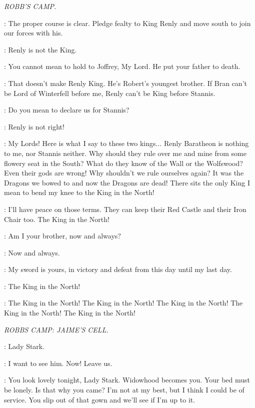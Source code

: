 \scene

\textit{ROBB'S CAMP.}


\GLOVER: The proper course is clear. Pledge fealty to King Renly and move south to join our forces with his. 

\ROBB: Renly is not the King. 

\GLOVER: You cannot mean to hold to Joffrey, My Lord. He put your father to death. 

\ROBB: That doesn't make Renly King. He's Robert's youngest brother. If Bran can't be Lord of Winterfell before me, Renly can't be King before Stannis. 

\GLOVER: Do you mean to declare us for Stannis? 

\BRACKEN: Renly is not right! 

\UMBER: My Lords! Here is what I say to these two kings$\ldots$  Renly
Baratheon is nothing to me, nor Stannis neither. Why should they rule
over me and mine from some flowery seat in the South? What do they
know of the Wall or the Wolfswood? Even their gods are wrong! Why
shouldn't we rule ourselves again? It was the Dragons we bowed to and
now the Dragons are dead! There sits the only King I mean to bend my
knee to  the King in the North! 

\BRACKEN:  I'll have peace on those terms. They can keep their Red Castle and their Iron Chair too. The King in the North! 

\THEON: Am I your brother, now and always? 

\ROBB: Now and always. 

\THEON: My sword is yours, in victory and defeat from this day until my last day. 

\UMBER: The King in the North! 

\CROWD: The King in the North! The King in the North! The King in the North! The King in the North! The King in the North! 


\scene

\textit{ROBBS CAMP: JAIME'S CELL.}


\GUARD: Lady Stark. 

\CATELYN: I want to see him. Now! Leave us. 

\JAIME: You look lovely tonight, Lady Stark. Widowhood becomes you. Your bed must be lonely. Is that why you came? I'm not at my best, but I think I could be of service. You slip out of that gown and we'll see if I'm up to it. 

